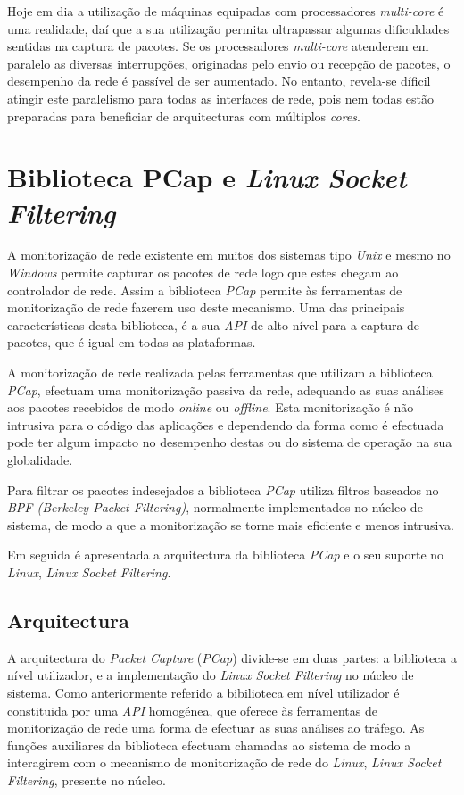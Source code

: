 Hoje em dia a utilização de máquinas equipadas com processadores \textit{multi-core} é uma realidade, daí que a sua utilização permita ultrapassar algumas dificuldades sentidas na captura de pacotes.
Se os processadores \textit{multi-core} atenderem em paralelo as diversas interrupções, originadas pelo envio ou recepção de pacotes, o desempenho da rede é passível de ser aumentado.
No entanto, revela-se díficil atingir este paralelismo para todas as interfaces de rede, pois nem todas estão preparadas para beneficiar de arquitecturas com múltiplos \textit{cores}.

\section{Biblioteca PCap e \textit{Linux Socket Filtering}}\label{sect:LibPcap}

A monitorização de rede existente em muitos dos sistemas tipo \textit{Unix} e mesmo no \textit{Windows} permite capturar os pacotes de rede logo que estes chegam ao controlador de rede.
Assim a biblioteca \textit{PCap}\cite{LibPcap} permite às ferramentas de monitorização de rede fazerem uso deste mecanismo.
Uma das principais características desta biblioteca, é a sua \textit{API} de alto nível para a captura de pacotes, que é igual em todas as plataformas.

A monitorização de rede realizada pelas ferramentas que utilizam a biblioteca \textit{PCap}, efectuam uma monitorização passiva da rede, adequando as suas análises aos pacotes recebidos de modo \textit{online} ou \textit{offline}.
Esta monitorização é não intrusiva para o código das aplicações e dependendo da forma como é efectuada pode ter algum impacto no desempenho destas ou do sistema de operação na sua globalidade.

Para filtrar os pacotes indesejados a biblioteca \textit{PCap} utiliza filtros baseados no \textit{BPF (Berkeley Packet Filtering)}, normalmente implementados no núcleo de sistema, de modo a que a monitorização se torne mais eficiente e menos intrusiva.

Em seguida é apresentada a arquitectura da biblioteca \textit{PCap} e o seu suporte no \textit{Linux}, \textit{Linux Socket Filtering}.

\subsection {Arquitectura}
\label{sect:architecture_libpcap}
A arquitectura do \textit{Packet Capture} (\textit{PCap}) divide-se em duas partes: a biblioteca a nível utilizador, e a implementação do \textit{Linux Socket Filtering} no núcleo de sistema.
Como anteriormente referido a bibilioteca em nível utilizador é constituida por uma \textit{API} homogénea, que oferece às ferramentas de monitorização de rede uma forma de efectuar as suas análises ao tráfego.
As funções auxiliares da biblioteca efectuam chamadas ao sistema de modo a interagirem com o mecanismo de monitorização de rede do \textit{Linux}, \textit{Linux Socket Filtering}, presente no núcleo.

